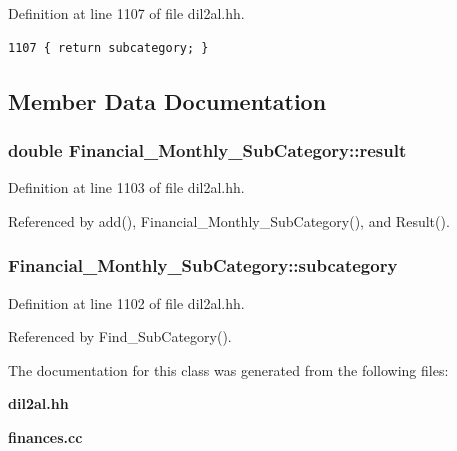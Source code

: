 Definition at line 1107 of file dil2al.hh.



\footnotesize\begin{verbatim}1107 { return subcategory; }
\end{verbatim}\normalsize 


\subsection{Member Data Documentation}
\subsubsection{\setlength{\rightskip}{0pt plus 5cm}double Financial\_\-Monthly\_\-Sub\-Category::result\hspace{0.3cm}{\tt  [protected]}}\label{classFinancial__Monthly__SubCategory_n1}




Definition at line 1103 of file dil2al.hh.

Referenced by add(), Financial\_\-Monthly\_\-Sub\-Category(), and Result().
\subsubsection{ Financial\_\-Monthly\_\-Sub\-Category::subcategory\hspace{0.3cm}{\tt  [protected]}}\label{classFinancial__Monthly__SubCategory_n0}




Definition at line 1102 of file dil2al.hh.

Referenced by Find\_\-Sub\-Category().

The documentation for this class was generated from the following files:\begin{CompactItemize}
\item 
{\bf dil2al.hh}\item 
{\bf finances.cc}\end{CompactItemize}
